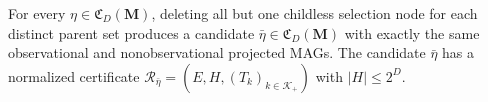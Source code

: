 For every \(\eta\in\mathfrak C_D(\mathbf M)\), deleting all but one childless selection node for each distinct parent set produces a candidate \(\bar\eta\in\mathfrak C_D(\mathbf M)\) with exactly the same observational and nonobservational projected MAGs.  The candidate \(\bar\eta\) has a normalized certificate \(\mathcal R_{\bar\eta}=(E,H,(T_k)_{k\in\mathcal K_+})\) with \(|H|\le 2^D\).